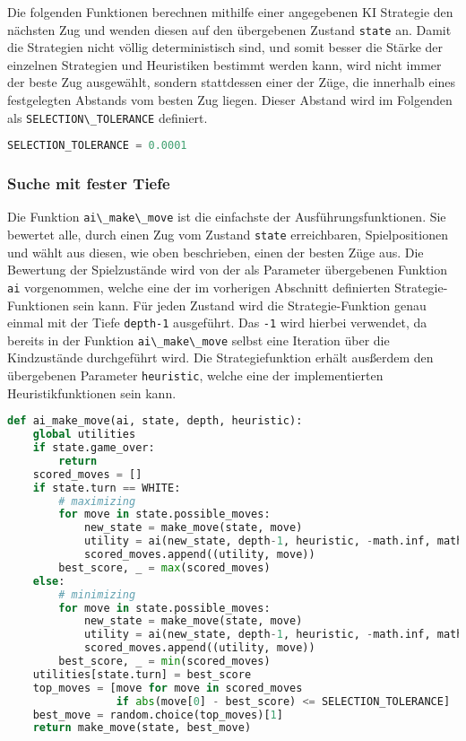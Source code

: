Die folgenden Funktionen berechnen mithilfe einer angegebenen KI
Strategie den nächsten Zug und wenden diesen auf den übergebenen Zustand
\passthrough{\lstinline!state!} an. Damit die Strategien nicht völlig
deterministisch sind, und somit besser die Stärke der einzelnen
Strategien und Heuristiken bestimmt werden kann, wird nicht immer der
beste Zug ausgewählt, sondern stattdessen einer der Züge, die innerhalb
eines festgelegten Abstands vom besten Zug liegen. Dieser Abstand wird
im Folgenden als \passthrough{\lstinline!SELECTION\_TOLERANCE!}
definiert.

\begin{lstlisting}[language=Python]
SELECTION_TOLERANCE = 0.0001
\end{lstlisting}

\hypertarget{suche-mit-fester-tiefe}{%
\subsubsection{Suche mit fester Tiefe}\label{suche-mit-fester-tiefe}}

Die Funktion \passthrough{\lstinline!ai\_make\_move!} ist die einfachste
der Ausführungsfunktionen. Sie bewertet alle, durch einen Zug vom
Zustand \passthrough{\lstinline!state!} erreichbaren, Spielpositionen
und wählt aus diesen, wie oben beschrieben, einen der besten Züge aus.
Die Bewertung der Spielzustände wird von der als Parameter übergebenen
Funktion \passthrough{\lstinline!ai!} vorgenommen, welche eine der im
vorherigen Abschnitt definierten Strategie-Funktionen sein kann. Für
jeden Zustand wird die Strategie-Funktion genau einmal mit der Tiefe
\passthrough{\lstinline!depth-1!} ausgeführt. Das
\passthrough{\lstinline!-1!} wird hierbei verwendet, da bereits in der
Funktion \passthrough{\lstinline!ai\_make\_move!} selbst eine Iteration
über die Kindzustände durchgeführt wird. Die Strategiefunktion erhält
ausßerdem den übergebenen Parameter \passthrough{\lstinline!heuristic!},
welche eine der implementierten Heuristikfunktionen sein kann.

\begin{lstlisting}[language=Python]
def ai_make_move(ai, state, depth, heuristic):
    global utilities
    if state.game_over:
        return
    scored_moves = []
    if state.turn == WHITE:
        # maximizing
        for move in state.possible_moves:
            new_state = make_move(state, move)
            utility = ai(new_state, depth-1, heuristic, -math.inf, math.inf)
            scored_moves.append((utility, move))
        best_score, _ = max(scored_moves)
    else:
        # minimizing
        for move in state.possible_moves:
            new_state = make_move(state, move)
            utility = ai(new_state, depth-1, heuristic, -math.inf, math.inf)
            scored_moves.append((utility, move))
        best_score, _ = min(scored_moves)
    utilities[state.turn] = best_score
    top_moves = [move for move in scored_moves
                 if abs(move[0] - best_score) <= SELECTION_TOLERANCE]
    best_move = random.choice(top_moves)[1]
    return make_move(state, best_move)
\end{lstlisting}

